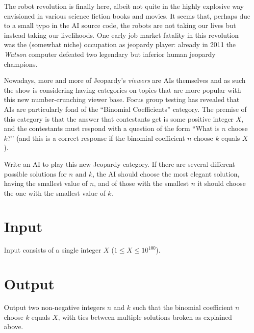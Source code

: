 
%
\noindent
The robot revolution is finally here, albeit not quite in the highly
explosive way envisioned in various science fiction books and movies.
It seems that, perhaps due to a small typo in the AI source code, the
robots are not taking our lives but instead taking our livelihoods.
One early job market fatality in this revolution was the (somewhat
niche) occupation as jeopardy player: already in 2011 the
\emph{Watson} computer defeated two legendary but inferior human
jeopardy champions.

Nowadays, more and more of Jeopardy's
\emph{viewers} are AIs themselves and as such the show is considering
having categories on topics that are more popular with this new
number-crunching viewer base.  Focus group testing has revealed that
AIs are particularly fond of the ``Binomial Coefficients'' category.  The
premise of this category is that the answer that contestants get is
some positive integer $X$, and the contestants must respond with a
question of the form ``What is $n$ choose $k$?'' (and this is a
correct response if the binomial coefficient $n$ choose $k$ equals $X$).

Write an AI to play this new Jeopardy category.  If there are several
different possible solutions for $n$ and $k$, the AI should choose the
most elegant solution, having the smallest value of $n$, and of those
with the smallest $n$ it should choose the one with the smallest value
of $k$.

\section*{Input}

Input consists of a single integer $X$ ($1 \le X \le 10^{100}$).

\section*{Output}

Output two non-negative integers $n$ and $k$ such that the binomial coefficient $n$
choose $k$ equals $X$, with ties between multiple solutions broken as
explained above.
